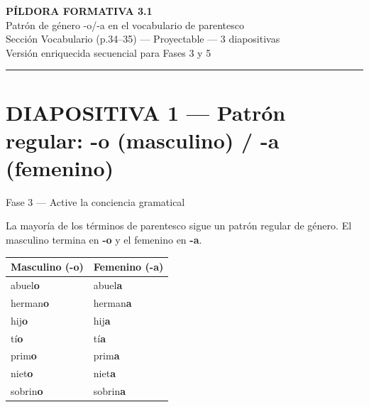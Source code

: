\documentclass[a4paper,11pt]{article}
\begin{document}
\begin{center}
{\LARGE\textbf{PÍLDORA FORMATIVA 3.1}}\\[0.3cm]
{\Large Patrón de género -o/-a en el vocabulario de parentesco}\\[0.2cm]
{\normalsize Sección Vocabulario (p.34--35) — Proyectable — 3 diapositivas}\\[0.2cm]
{\small Versión enriquecida secuencial para Fases 3 y 5}
\end{center}

\vspace{0.8cm}


\noindent\textcolor{violeta}{\rule{\linewidth}{2.5pt}}

\section*{DIAPOSITIVA 1 — Patrón regular: -o (masculino) / -a (femenino)}

{\small Fase 3 — Active la conciencia gramatical}

\vspace{0.3cm}

La mayoría de los términos de parentesco sigue un patrón regular de género. El masculino termina en \textbf{-o} y el femenino en \textbf{-a}.

\vspace{0.5cm}

\begin{center}
\renewcommand{\arraystretch}{1.6}
\begin{tabular}{|>{\centering\arraybackslash}p{5cm}|>{\centering\arraybackslash}p{5cm}|}
\hline
\rowcolor{azulg!15}
\textbf{\textcolor{azulg}{Masculino (-o)}} & \textbf{\textcolor{rojog}{Femenino (-a)}} \\
\hline
abuel\textbf{\textcolor{azulg}{o}} & abuel\textbf{\textcolor{rojog}{a}} \\
\hline
herman\textbf{\textcolor{azulg}{o}} & herman\textbf{\textcolor{rojog}{a}} \\
\hline
hij\textbf{\textcolor{azulg}{o}} & hij\textbf{\textcolor{rojog}{a}} \\
\hline
tí\textbf{\textcolor{azulg}{o}} & tí\textbf{\textcolor{rojog}{a}} \\
\hline
prim\textbf{\textcolor{azulg}{o}} & prim\textbf{\textcolor{rojog}{a}} \\
\hline
niet\textbf{\textcolor{azulg}{o}} & niet\textbf{\textcolor{rojog}{a}} \\
\hline
sobrin\textbf{\textcolor{azulg}{o}} & sobrin\textbf{\textcolor{rojog}{a}} \\
\hline
\end{tabular}
\end{center}
\end{document}
